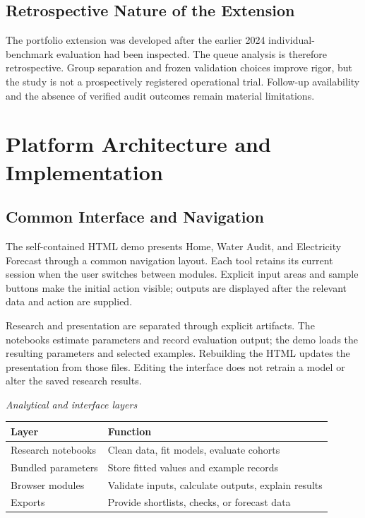 \documentclass[12pt,a4paper]{article}
\begin{document}
\subsection{Retrospective Nature of the Extension}
The portfolio extension was developed after the earlier 2024 individual-benchmark evaluation had been inspected. The queue analysis is therefore retrospective. Group separation and frozen validation choices improve rigor, but the study is not a prospectively registered operational trial. Follow-up availability and the absence of verified audit outcomes remain material limitations.

\newpage
\section{Platform Architecture and Implementation}
\subsection{Common Interface and Navigation}
The self-contained HTML demo presents Home, Water Audit, and Electricity Forecast through a common navigation layout. Each tool retains its current session when the user switches between modules. Explicit input areas and sample buttons make the initial action visible; outputs are displayed after the relevant data and action are supplied.

Research and presentation are separated through explicit artifacts. The notebooks estimate parameters and record evaluation output; the demo loads the resulting parameters and selected examples. Rebuilding the HTML updates the presentation from those files. Editing the interface does not retrain a model or alter the saved research results.

\begin{center}\small
\textit{Analytical and interface layers}\par\medskip
\begin{tabularx}{\textwidth}{XX}
\toprule
\textbf{Layer} & \textbf{Function}\\\midrule
Research notebooks & Clean data, fit models, evaluate cohorts\\
Bundled parameters & Store fitted values and example records\\
Browser modules & Validate inputs, calculate outputs, explain results\\
Exports & Provide shortlists, checks, or forecast data\\
\bottomrule\end{tabularx}\end{center}
\end{document}
